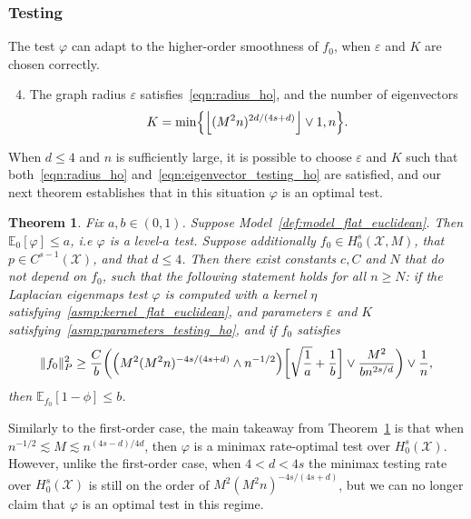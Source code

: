 \documentclass[aos]{imsart}
\theoremstyle{plain}
\newtheorem{theorem}{Theorem}
\theoremstyle{definition}
\theoremstyle{remark}
\newcommand{\Ebb}{\mathbb{E}}
\newcommand{\mc}[1]{\mathcal{#1}}
\newcommand{\floor}[1]{\left\lfloor #1 \right\rfloor}
\newcommand{\1}{\mathbf{1}}
\begin{document}
\subsubsection{Testing} The test $\varphi$ can adapt to the higher-order smoothness of $f_0$, when $\varepsilon$ and $K$ are chosen correctly.
\begin{enumerate}[label=(P\arabic*)]
	\setcounter{enumi}{3}
	\item 
	\label{asmp:parameters_testing_ho}
	The graph radius $\varepsilon$ satisfies~\eqref{eqn:radius_ho}, and the number of eigenvectors
	\begin{equation}
	\label{eqn:eigenvector_testing_ho}
	K = \min\Bigl\{\floor{(M^2n)^{2d/(4s + d)}} \vee 1, n\Bigr\}.
	\end{equation}
\end{enumerate}
When $d \leq 4$ and $n$ is sufficiently large, it is possible to choose $\varepsilon$ and $K$ such that both~\eqref{eqn:radius_ho} and~\eqref{eqn:eigenvector_testing_ho} are satisfied, and our next theorem establishes that in this situation $\varphi$ is an optimal test.
\begin{theorem}
	\label{thm:laplacian_eigenmaps_testing_ho}
	Fix $a,b \in (0,1)$. Suppose Model~\ref{def:model_flat_euclidean}. Then $\mathbb{E}_0[\varphi] \leq a$, i.e $\varphi$ is a level-$a$ test. Suppose additionally $f_0 \in H_0^s(\mc{X},M)$, that $p \in C^{s-1}(\mc{X})$, and that $d \leq 4$. Then there exist constants $c,C$ and $N$ that do not depend on $f_0$, such that the following statement holds for all $n \geq N$: if the Laplacian eigenmaps test $\varphi$ is computed with a kernel $\eta$ satisfying~\ref{asmp:kernel_flat_euclidean}, and parameters $\varepsilon$ and $K$ satisfying~\ref{asmp:parameters_testing_ho}, and if $f_0$ satisfies
	\begin{equation}
	\label{eqn:laplacian_eigenmaps_testing_criticalradius_ho}
	\|f_0\|_P^2 \geq \frac{C}{b}\biggl(\Bigl(M^2(M^2n)^{-4s/(4s + d) } \wedge n^{-1/2}\Bigr)\biggl[\sqrt{\frac{1}{a}} + \frac{1}{b}\biggr] \vee \frac{M^2}{b n^{2s/d}} \biggr) \vee \frac{1}{n},
	\end{equation}
	then $\Ebb_{f_0}[1 - \phi] \leq b$.
\end{theorem}
Similarly to the first-order case, the main takeaway from Theorem~\ref{thm:laplacian_eigenmaps_testing_ho} is that when $n^{-1/2} \lesssim M \lesssim n^{(4s - d)/4d}$, then $\varphi$ is a minimax rate-optimal test over $H_0^s(\mc{X})$. However, unlike the first-order case, when $4 < d < 4s$ the minimax testing rate over $H_0^s(\mc{X})$ is still on the order of $M^2(M^2n)^{-4s/(4s + d)}$, but we can no longer claim that $\varphi$ is an optimal test in this regime.
\end{document}
